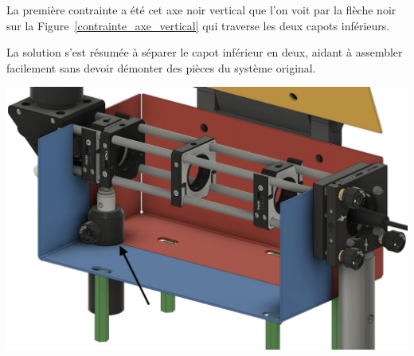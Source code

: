 \begin{minipage}[c]{0.4\textwidth}
    La première contrainte a été cet axe noir vertical que l'on voit par la flèche noir sur la Figure~\ref{contrainte_axe_vertical} qui traverse les deux capots inférieurs.

    La solution s'est résumée à séparer le capot inférieur en deux, aidant à assembler facilement sans devoir démonter des pièces du système original.
\end{minipage}\hfill
\begin{minipage}[c]{0.58\textwidth}
    \begin{center}
        \includegraphics[width=\textwidth]{assets/figures/Protections_laser/Securite_mecanique/Protection_entree_laser/contrainte_axe_vertical.jpeg}
    \end{center}
    \label{contrainte_axe_vertical}
\end{minipage}

